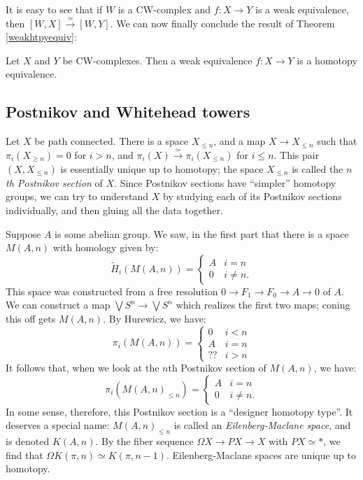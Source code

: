 It is easy to see that if $W$ is a CW-complex and $f:X\to Y$ is a weak equivalence, then $[W,X]\xrightarrow{\simeq}[W,Y]$. 
We can now finally conclude the result of Theorem \ref{weakhtpyequiv}:
\begin{corollary}
    Let $X$ and $Y$ be CW-complexes.
    Then a weak equivalence $f:X\to Y$ is a homotopy equivalence.
\end{corollary}
\subsection{Postnikov and Whitehead towers}
Let $X$ be path connected.
There is a space $X_{\leq n}$, and a map $X\to X_{\leq n}$ such that $\pi_i(X_{\geq n}) = 0$ for $i>n$,
and $\pi_i(X)\xrightarrow{\simeq}\pi_i(X_{\leq n})$ for $i\leq n$.
This pair $(X,X_{\leq n})$ is essentially unique up to homotopy; the space $X_{\leq n}$ is called 
the \emph{$n$th Postnikov section} of $X$.
Since Postnikov sections have ``simpler'' homotopy groups, we can try to understand $X$ by studying each of its Postnikov
sections individually, and then gluing all the data together.

Suppose $A$ is some abelian group.
We saw, in the first part that there is a space $M(A,n)$ with homology given by:
\begin{equation*}
    \widetilde{H}_i(M(A,n)) = \begin{cases}
	A & i = n\\
	0 & i\neq n.
    \end{cases}
\end{equation*}
This space was constructed from a free resolution $0\to F_1\to F_0\to A\to 0$ of $A$.
We can construct a map $\bigvee S^n\to \bigvee S^n$ which realizes the first two maps; coning this off gets $M(A,n)$.
By Hurewicz, we have:
\begin{equation*}
    \pi_i(M(A,n)) = \begin{cases}
	0 & i<n\\
	A & i = n\\
	?? & i>n
    \end{cases}
\end{equation*}
It follows that, when we look at the $n$th Postnikov section of $M(A,n)$, we have:
\begin{equation*}
    \pi_i(M(A,n)_{\leq n}) = \begin{cases}
	A & i = n\\
	0 & i\neq n.
    \end{cases}
\end{equation*}
In some sense, therefore, this Postnikov section is a ``designer homotopy type''.
It deserves a special name: $M(A,n)_{\leq n}$ is called an \emph{Eilenberg-Maclane space}, and is denoted $K(A,n)$.
By the fiber sequence $\Omega X\to PX\to X$ with $PX\simeq \ast$, we find that $\Omega K(\pi,n)\simeq K(\pi,n-1)$.
Eilenberg-Maclane spaces are unique up to homotopy.


